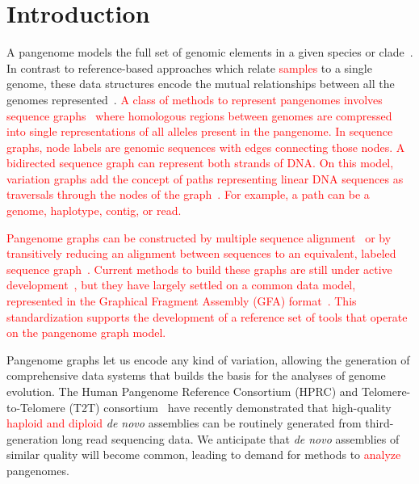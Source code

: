 \documentclass{bioinfo}
\newcommand{\REVIEWED}[1]{{\textcolor{Red}{#1}}}
\begin{document}
\section{Introduction}
A pangenome models the full set of genomic elements in a given species or clade~\REVIEWED{\citep{Tettelin_2008,cpang2018,Eizenga_2020}}.
In contrast to reference-based approaches which relate \REVIEWED{samples} to a single genome, these data structures encode the mutual relationships between all the genomes represented\REVIEWED{~\citep{Ballouz2019}}.
\REVIEWED{A class of methods to represent pangenomes involves sequence graphs~\citep{Hein1989, Paten:2017} where homologous regions between genomes are compressed into single representations of all alleles present in the pangenome.
In sequence graphs, node labels are \REVIEWED{genomic sequences} with edges connecting those nodes.
A bidirected sequence graph can \REVIEWED{represent both strands of DNA}.
On this model, variation graphs add the concept of paths representing linear \REVIEWED{DNA} sequences as traversals through the nodes of the graph~\citep{Garrison:2018}.
\REVIEWED{For example, a} path can be a genome, haplotype, contig, or read.}

\REVIEWED{Pangenome graphs can be constructed by multiple sequence alignment~\citep{Lee_2002,Grasso_2004} or by transitively reducing an alignment between sequences to an equivalent, labeled sequence graph~\citep{Kehr_2014,Garrison_2019_thesis}.
Current methods to build these graphs are still under active development~\citep{Li:2020,Armstrong:2020,pggb}, but they have largely settled on a common data model, represented in the Graphical Fragment Assembly (GFA) format~\citep{GFA}.
This standardization supports the development of a reference set of tools that operate on the pangenome graph model.}

Pangenome graphs let us encode any kind of variation, allowing the generation of comprehensive data systems that builds the basis for the analyses of genome evolution.
The Human Pangenome Reference Consortium (HPRC) and Telomere-to-Telomere (T2T) consortium~\citep{Miga:2020, Logsdon_2021, Nurk_2021, Jarvis2022} have recently demonstrated that high-quality \REVIEWED{haploid and diploid} \textit{de novo} assemblies can be routinely generated from third-generation long read sequencing data.
We anticipate that \textit{de novo} assemblies of similar quality will become common, leading to demand for methods to \REVIEWED{analyze} pangenomes.
\end{document}
